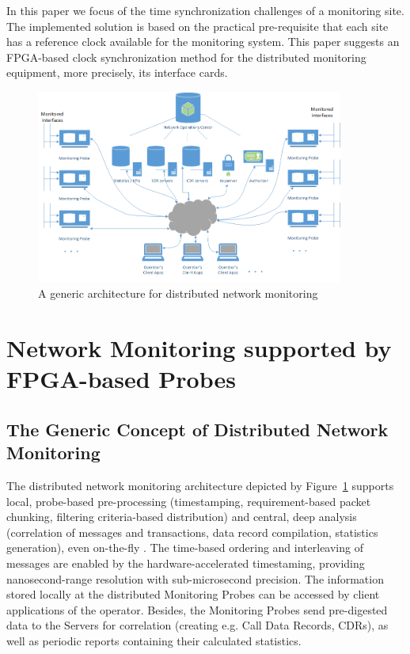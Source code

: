\documentclass[journal]{IEEEtran}
\begin{document}
In this paper we focus of the time synchronization challenges of a monitoring site. The implemented solution is based on the practical pre-requisite that each site has a reference clock available for the monitoring system. This paper suggests an FPGA-based clock synchronization method for the distributed monitoring equipment, more precisely, its interface cards.

\begin{figure}[!htb]
    \centering
    \includegraphics[width=0.9\textwidth]{figures_raw/Network_monitoring.png}
    \caption{A generic architecture for distributed network monitoring}
    \label{fig:network_monitoring}
\end{figure}

\section{Network Monitoring supported by FPGA-based Probes}\label{sec:NetMon}
\subsection{The Generic Concept of Distributed Network Monitoring}

The distributed network monitoring architecture depicted by Figure~\ref{fig:network_monitoring} supports local, probe-based pre-processing (timestamping, requirement-based packet chunking, filtering criteria-based distribution) and central, deep analysis (correlation of messages and transactions, data record compilation, statistics generation), even on-the-fly \cite{old_5}. The time-based ordering and interleaving of messages are enabled by the hardware-accelerated timestaming, providing nanosecond-range resolution with sub-microsecond precision. The information stored locally at the distributed Monitoring Probes can be accessed by client applications of the operator. Besides, the Monitoring Probes send pre-digested data to the Servers for correlation (creating e.g. Call Data Records, CDRs), as well as periodic reports containing their calculated statistics.
\end{document}

